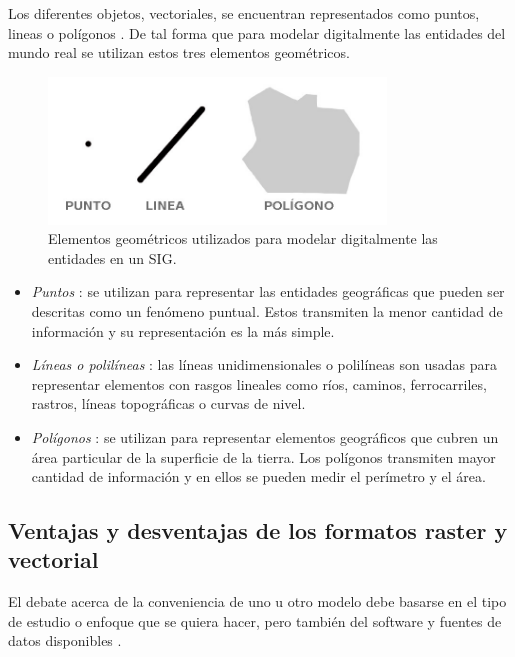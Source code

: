 Los diferentes objetos, vectoriales, se encuentran representados como puntos, lineas o polígonos
\cite{fAlonsoSig2006}. De tal forma que para modelar digitalmente las entidades del mundo real se
utilizan estos tres elementos geométricos.

\begin{figure}
\centering
\includegraphics[width=0.8\textwidth]{capitulo-2/graphics/dimensiones-datos.jpg}
\caption{\label{fig:sig-xyz} Elementos geométricos utilizados para modelar digitalmente las entidades en un SIG.}
\end{figure}

\begin{itemize}
    \item \textit{Puntos} : se utilizan para representar las entidades geográficas que pueden ser
    descritas como un fenómeno puntual. Estos transmiten la menor cantidad de información y su representación es la más simple.

    \item \textit{Líneas o polilíneas} : las líneas unidimensionales o polilíneas son usadas para
    representar elementos con rasgos lineales como ríos, caminos, ferrocarriles, rastros, líneas
    topográficas o curvas de nivel.

    \item \textit{Polígonos} : se utilizan para representar elementos geográficos que cubren un
    área particular de la superficie de la tierra. Los polígonos transmiten mayor cantidad de
    información y en ellos se pueden medir el perímetro y el área.
\end{itemize}

\subsection{Ventajas y desventajas de los formatos raster y vectorial}

El debate acerca de la conveniencia de uno u otro modelo debe basarse en el tipo de estudio o
enfoque que se quiera hacer, pero también del software y fuentes de datos disponibles
\cite{fAlonsoSig2006}.

